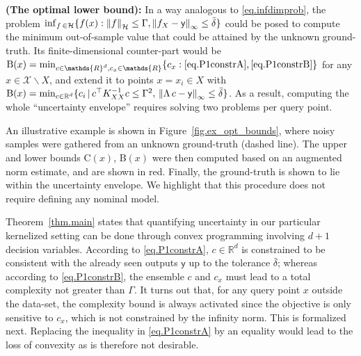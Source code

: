 \begin{remark}
	\textbf{(The optimal lower bound):}
	In a way analogous to \eqref{eq.infdimprob}, the problem $\inf_{f \, \in \mathcal{H}} \{ f(x) : \left\| f \right\|_\mathcal{H} \leq \Gamma, \left\| f_X - \mathsf{y} \right\|_\infty \leq \bar \delta \} $ could be posed to compute the minimum out-of-sample value that could be attained by the unknown ground-truth. Its finite-dimensional counter-part would be ${\normalfont \text{B}(x)} = \min_{c \in \mathds{R}^d, c_x \in \mathds{R}}  \{c_x : \eqref{eq.P1constrA}, \eqref{eq.P1constrB}\}$ for any $x \in \mathcal{X} \backslash X$, and extend it to points $x = x_i \in X$ with $\text{B}(x) = \min_{c \in \mathbb{R}^d} \{c_i \, | \, c^\top K_{XX}^{-1}c \leq \Gamma^2, \, \left\| \Lambda \, c - \mathsf{y} \right\|_\infty \leq \bar \delta \}$. As a result, computing the whole  ``uncertainty envelope'' requires solving two problems per query point.
\end{remark}

An illustrative example is shown in Figure~\ref{fig.ex_opt_bounds}, where noisy samples were gathered from an unknown ground-truth (dashed line). The upper and lower bounds C$(x)$, B$(x)$ were then computed based on an augmented norm estimate, and are shown in red. Finally, the ground-truth is shown to lie within the uncertainty envelope. We highlight that this procedure does not require defining any nominal model.

Theorem~\ref{thm.main} states that quantifying uncertainty in our particular kernelized setting can be done through convex programming involving $d+1$ decision variables. According to \eqref{eq.P1constrA}, $c \in \mathbb{R}^d$ is constrained to be consistent with the already seen outputs $\mathsf{y}$ up to the tolerance $\bar\delta$; whereas according to \eqref{eq.P1constrB}, the ensemble $c$ and $c_x$ must lead to a total complexity not greater than $\Gamma$. It turns out that, for any query point $x$ outside the data-set, the complexity bound is always activated since the objective is only sensitive to $c_x$, which is not constrained by the infinity norm. This is formalized next. Replacing the inequality in \eqref{eq.P1constrA} by an equality would lead to the loss of convexity as is therefore not desirable.

